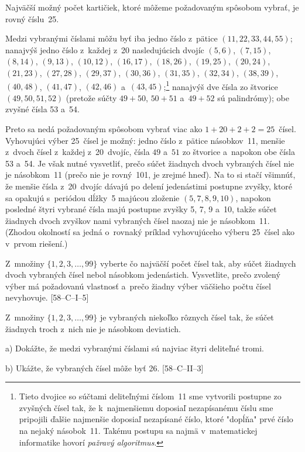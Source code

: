 {\odpoved
Najväčší možný počet kartičiek, ktoré môžeme
požadovaným spôsobom vybrať, je rovný číslu~25.

\goodbreak
\ineriesenie
Medzi vybranými číslami môžu byť
\bulet
iba jedno číslo z~pätice $(11, 22, 33, 44, 55)$;
\bulet
nanajvýš jedno číslo z~každej z~20 nasledujúcich dvojíc
$(5, 6)$, $(7, 15)$, $(8, 14)$, $(9, 13)$, $(10, 12)$, $(16, 17)$,
$(18, 26)$, $(19, 25)$, $(20, 24)$, $(21, 23)$, $(27, 28)$, $(29, 37)$,
$(30, 36)$, $(31, 35)$, $(32, 34)$, $(38, 39)$, $(40, 48)$, $(41, 47)$,
$(42, 46)$ a~$(43, 45)$;\footnote{Tieto dvojice
so súčtami deliteľnými číslom~11 sme vytvorili
postupne zo zvyšných čísel tak, že k~najmenšiemu doposiaľ nezapísanému
číslu sme pripojili ďalšie najmenšie doposiaľ nezapísané
číslo, ktoré "dopĺňa" prvé číslo na nejaký násobok~11.
Takému postupu sa najmä v~matematickej informatike hovorí {\it
pažravý algoritmus}.}
\bulet
nanajvýš dve čísla zo štvorice $(49, 50, 51, 52)$
(pretože súčty $49+50$, $50+51$ a~$49+52$ sú palindrómy);
\bulet
obe zvyšné čísla 53 a~54.

Preto sa nedá požadovaným spôsobom vybrať viac ako $1+20+2+2=25$~čísel.
Vyhovujúci výber 25~čísel je možný: jedno číslo
z~pätice násobkov~11, menšie z~dvoch čísel z~každej z~20~dvojíc,
čísla $49$ a~$51$ zo štvorice a~napokon obe čísla 53 a~54.
Je však nutné vysvetliť, prečo súčet žiadnych
dvoch vybraných čísel nie je násobkom~11 (prečo nie je rovný~101,
je zrejmé hneď). Na to si stačí všimnúť,
že menšie čísla z~20~dvojíc dávajú po
delení jedenástimi postupne zvyšky, ktoré sa opakujú s~periódou
dĺžky~5 majúcou zloženie $(5, 7, 8, 9, 10)$, napokon posledné štyri
vybrané čísla majú postupne zvyšky 5, 7, 9 a~10,
takže súčet žiadnych dvoch zvyškov nami vybraných čísel
naozaj nie je násobkom~11.
(Zhodou okolností sa jedná o~rovnaký príklad vyhovujúceho výberu 25~čísel
ako v~prvom riešení.)


Z~množiny $\{1,2,3,\dots,99\}$ vyberte čo najväčší počet
čísel tak, aby súčet žiadnych dvoch vybraných čísel nebol násobkom
jedenástich. Vysvetlite, prečo
zvolený výber má požadovanú vlastnosť a~prečo žiadny
výber väčšieho počtu čísel nevyhovuje. [\hbox{58--C--I--5}]

\D
Z~množiny $\{1,2,3,\dots,99\}$ je vybraných niekoľko rôznych čísel tak, že súčet žiadnych troch z~nich nie je násobkom deviatich.
\item{a)} Dokážte, že medzi vybranými číslami sú najviac štyri deliteľné tromi.
\item{b)} Ukážte, že vybraných čísel môže byť 26.
[58--C--II--3]
}

